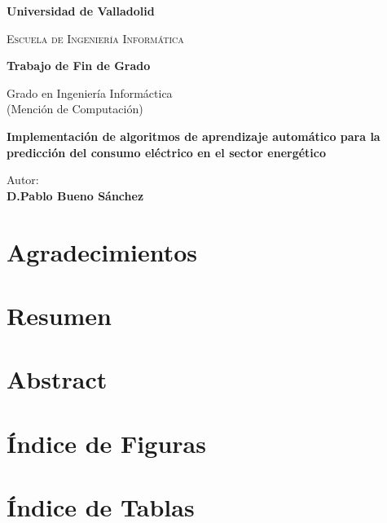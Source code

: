 \documentclass[a4paper,12pt]{article}
\begin{document}
\begin{titlepage}
    \centering
    {\bfseries\Large Universidad de Valladolid \par}
    \vspace{2cm}
    {\scshape\Huge Escuela de Ingeniería Informática \par}
    {\bfseries\Large Trabajo de Fin de Grado \par}
    \vspace{2cm}
    {\Large Grado en Ingeniería Informáctica 
    \\ (Mención de Computación) \par}
    \vspace{2.5cm}
    {\bfseries\Huge Implementación de algoritmos de aprendizaje automático para la
    predicción del consumo eléctrico en el sector energético \par}
    \vspace{2cm}
    \raggedleft
    {Autor: \\
    \bfseries D.Pablo Bueno Sánchez}
\end{titlepage}

\tableofcontents

\newpage

\section*{Agradecimientos}

\newpage

\section*{Resumen}

\newpage

\section*{Abstract}

\section*{Índice de Figuras}

\newpage

\section*{Índice de Tablas}
\end{document}
